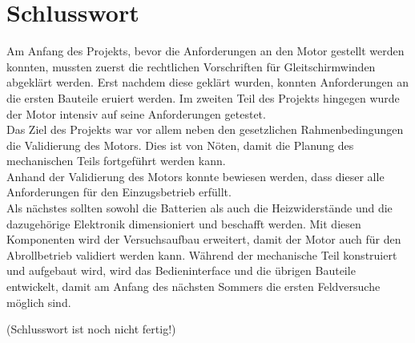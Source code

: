 \section{Schlusswort}\label{sec:Schlusswort}
Am Anfang des Projekts, bevor die Anforderungen an den Motor gestellt werden konnten, mussten zuerst die rechtlichen Vorschriften für Gleitschirmwinden abgeklärt werden. Erst nachdem diese geklärt wurden, konnten Anforderungen an die ersten Bauteile eruiert werden. Im zweiten Teil des Projekts hingegen wurde der Motor intensiv auf seine Anforderungen getestet.\\
Das Ziel des Projekts war vor allem neben den gesetzlichen Rahmenbedingungen die Validierung des Motors. Dies ist von Nöten, damit die Planung des mechanischen Teils fortgeführt werden kann.\\
Anhand der Validierung des Motors konnte bewiesen werden, dass dieser alle Anforderungen für den Einzugsbetrieb erfüllt.\\
Als nächstes sollten sowohl die Batterien als auch die Heizwiderstände und die dazugehörige Elektronik dimensioniert und beschafft werden. Mit diesen Komponenten wird der Versuchsaufbau erweitert, damit der Motor auch für den Abrollbetrieb validiert werden kann. Während der mechanische Teil konstruiert und aufgebaut wird, wird das Bedieninterface und die übrigen Bauteile entwickelt, damit am Anfang des nächsten Sommers die ersten Feldversuche möglich sind.



(Schlusswort ist noch nicht fertig!)
